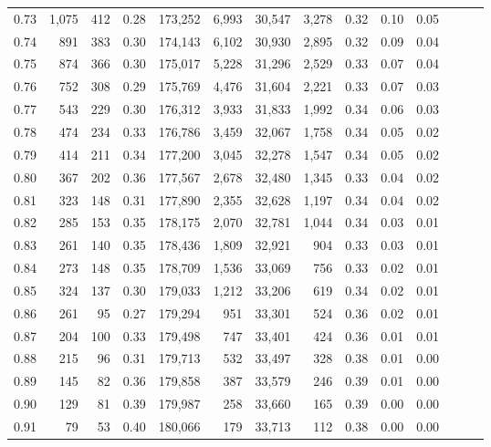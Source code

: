 \begin{tabular}{rrrrrrrrrrrrrr}
0.73 &  1,075 &  412 &  0.28 &  173,252 &    6,993 &  30,547 &   3,278 &  0.32 &  0.10 &      0.05 \\
0.74 &    891 &  383 &  0.30 &  174,143 &    6,102 &  30,930 &   2,895 &  0.32 &  0.09 &      0.04 \\
0.75 &    874 &  366 &  0.30 &  175,017 &    5,228 &  31,296 &   2,529 &  0.33 &  0.07 &      0.04 \\
0.76 &    752 &  308 &  0.29 &  175,769 &    4,476 &  31,604 &   2,221 &  0.33 &  0.07 &      0.03 \\
0.77 &    543 &  229 &  0.30 &  176,312 &    3,933 &  31,833 &   1,992 &  0.34 &  0.06 &      0.03 \\
0.78 &    474 &  234 &  0.33 &  176,786 &    3,459 &  32,067 &   1,758 &  0.34 &  0.05 &      0.02 \\
0.79 &    414 &  211 &  0.34 &  177,200 &    3,045 &  32,278 &   1,547 &  0.34 &  0.05 &      0.02 \\
0.80 &    367 &  202 &  0.36 &  177,567 &    2,678 &  32,480 &   1,345 &  0.33 &  0.04 &      0.02 \\
0.81 &    323 &  148 &  0.31 &  177,890 &    2,355 &  32,628 &   1,197 &  0.34 &  0.04 &      0.02 \\
0.82 &    285 &  153 &  0.35 &  178,175 &    2,070 &  32,781 &   1,044 &  0.34 &  0.03 &      0.01 \\
0.83 &    261 &  140 &  0.35 &  178,436 &    1,809 &  32,921 &     904 &  0.33 &  0.03 &      0.01 \\
0.84 &    273 &  148 &  0.35 &  178,709 &    1,536 &  33,069 &     756 &  0.33 &  0.02 &      0.01 \\
0.85 &    324 &  137 &  0.30 &  179,033 &    1,212 &  33,206 &     619 &  0.34 &  0.02 &      0.01 \\
0.86 &    261 &   95 &  0.27 &  179,294 &      951 &  33,301 &     524 &  0.36 &  0.02 &      0.01 \\
0.87 &    204 &  100 &  0.33 &  179,498 &      747 &  33,401 &     424 &  0.36 &  0.01 &      0.01 \\
0.88 &    215 &   96 &  0.31 &  179,713 &      532 &  33,497 &     328 &  0.38 &  0.01 &      0.00 \\
0.89 &    145 &   82 &  0.36 &  179,858 &      387 &  33,579 &     246 &  0.39 &  0.01 &      0.00 \\
0.90 &    129 &   81 &  0.39 &  179,987 &      258 &  33,660 &     165 &  0.39 &  0.00 &      0.00 \\
0.91 &     79 &   53 &  0.40 &  180,066 &      179 &  33,713 &     112 &  0.38 &  0.00 &      0.00 \\

\end{tabular}
